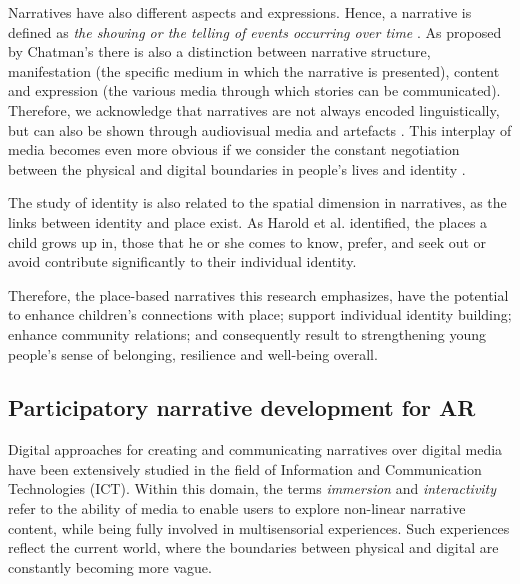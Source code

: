 \documentclass[acmlarge,screen,dvipsnames]{acmart}
\begin{document}
Narratives have also different aspects and expressions. Hence, a narrative is defined as \emph{the showing or the telling of events occurring over time} \cite{10.2307/1343711}. As proposed by Chatman's \cite{10.2307/468421} there is also a distinction between narrative structure, manifestation (the specific medium in which the narrative is presented), content and expression (the various media through which stories can be communicated). Therefore, we acknowledge that narratives are not always encoded linguistically, but can also be shown through audiovisual media and artefacts \cite{PAHL2004339}. This interplay of media becomes even more obvious if we consider the constant negotiation between the physical and digital boundaries in people’s lives and identity \cite{Jordan2009}. 

The study of identity is also related to the spatial dimension in narratives, as the links between identity and place exist. As Harold et al. \cite{PROSHANSKY198357} identified, the places a child grows up in, those that he or she comes to know, prefer, and seek out or avoid contribute significantly to their individual identity.

Therefore, the place-based narratives this research emphasizes, have the potential to enhance children's connections with place; support individual identity building; enhance community relations; and consequently result to strengthening young people's sense of belonging, resilience and well-being overall.

\subsection{Participatory narrative development for AR}
Digital approaches for creating and communicating narratives over digital media have been extensively studied in the field of Information and Communication Technologies (ICT). Within this domain, the terms \emph{immersion} and \emph{interactivity} refer to the ability of media to enable users to explore non-linear narrative content, while being fully involved in multisensorial experiences. Such experiences reflect the current world, where the boundaries between physical and digital are constantly becoming more vague.
\end{document}
